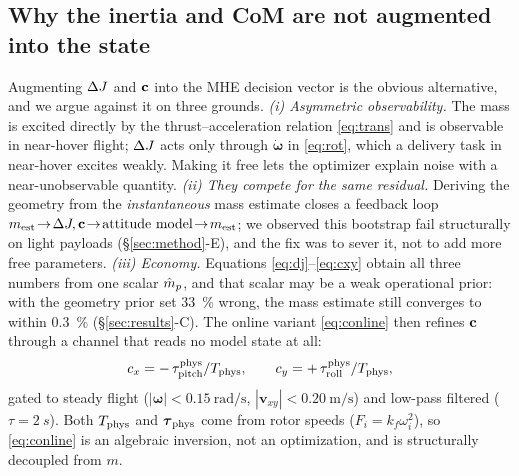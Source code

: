 \subsection{Why the inertia and CoM are not augmented into the state}
\label{sec:whynotaugment}
Augmenting $\Delta J$ and $\mathbf{c}$ into the MHE decision vector is the obvious alternative, and we
argue against it on three grounds. \emph{(i) Asymmetric observability.} The mass is excited
directly by the thrust--acceleration relation \eqref{eq:trans} and is observable in near-hover
flight; $\Delta J$ acts only through $\dot{\boldsymbol{\omega}}$ in \eqref{eq:rot}, which a delivery
task in near-hover excites weakly. Making it free lets the optimizer explain noise with a
near-unobservable quantity. \emph{(ii) They compete for the same residual.} Deriving the
geometry from the \emph{instantaneous} mass estimate closes a feedback loop
$m_{\mathrm{est}} \!\rightarrow\! \Delta J,\mathbf{c} \!\rightarrow\! \text{attitude model} \!\rightarrow\! m_{\mathrm{est}}$;
we observed this bootstrap fail structurally on light payloads (\S\ref{sec:method}-E), and the
fix was to sever it, not to add more free parameters. \emph{(iii) Economy.} Equations
\eqref{eq:dj}--\eqref{eq:cxy} obtain all three numbers from one scalar $\hat{m}_p$, and that scalar
may be a weak operational prior: with the geometry prior set \SI{33}{\percent} wrong, the mass
estimate still converges to within \SI{0.3}{\percent} (\S\ref{sec:results}-C). The online
variant \eqref{eq:conline} then refines $\mathbf{c}$ through a channel that reads no model state at
all:
\begin{equation}
c_x = -\,\tau_{\mathrm{pitch}}^{\mathrm{phys}} / T_{\mathrm{phys}}, \qquad
c_y = +\,\tau_{\mathrm{roll}}^{\mathrm{phys}} / T_{\mathrm{phys}}, \label{eq:conline}
\end{equation}
gated to steady flight ($|\boldsymbol{\omega}| < \SI{0.15}{\radian\per\second}$,
$|\mathbf{v}_{xy}| < \SI{0.20}{\meter\per\second}$) and low-pass filtered
($\tau = \SI{2}{s}$). Both $T_{\mathrm{phys}}$ and $\boldsymbol{\tau}_{\mathrm{phys}}$ come from rotor speeds
($F_i = k_f \omega_i^2$), so \eqref{eq:conline} is an algebraic inversion, not an optimization,
and is structurally decoupled from $m$.


